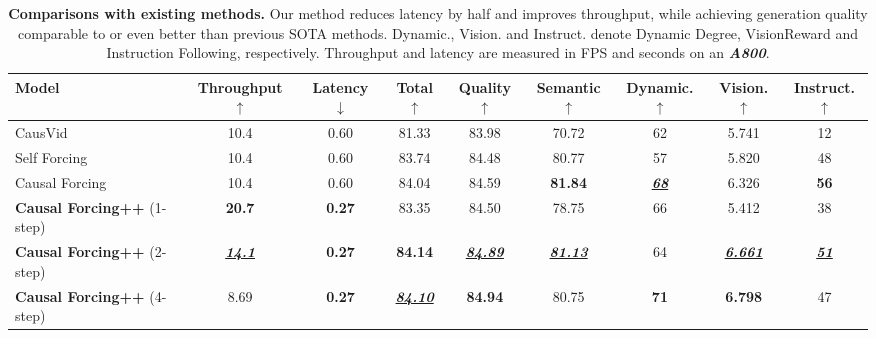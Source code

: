 \begin{table}[h]
\small\setlength{\tabcolsep}{1pt} %
\caption{\textbf{Comparisons with existing methods.} Our method reduces latency by half and improves throughput, while achieving generation quality comparable to or even better than previous SOTA methods. Dynamic., Vision. and Instruct. denote Dynamic Degree, VisionReward and Instruction Following, respectively. Throughput and latency are measured in FPS and seconds on an \textbf{\textit{A800}}.\protect\footnotemark}
  \label{tab:performance-comparison}
  \centering
  \begin{tabular}{lcccccccc}
      \toprule
      Model & Throughput $\uparrow$& Latency $\downarrow$&Total$\uparrow$ & Quality$\uparrow$ & Semantic$\uparrow$ 
      & Dynamic.$\uparrow$
      & Vision.$\uparrow$
      & Instruct.$\uparrow$
       \\
    \midrule
    CausVid~\cite{yin2025slow}& 10.4 & 0.60 & 81.33 & 83.98 & 70.72 &  62  & 5.741 & 12 \\
    Self Forcing~\cite{huang2025self} & 10.4 & 0.60 & 83.74 & 84.48 & 80.77 & 57 & 5.820 & 48 \\
   Causal Forcing~\cite{zhu2026causal}  & 10.4 & 0.60 & 84.04 & 84.59& \textbf{81.84} & \underline{\textbf{\textit{68}}} & 6.326 & \textbf{56} \\
      \textbf{Causal Forcing++} (1-step)  & \textbf{20.7} & \textbf{0.27} &83.35 & 84.50  &   78.75 & 66 & 5.412 & 38\\
      \textbf{Causal Forcing++} (2-step)  & \underline{\textit{\textbf{14.1}}} & \textbf{0.27} & \textbf{84.14} & \underline{\textbf{\textit{84.89}}}  &   \underline{\textbf{\textit{81.13}}} & 64 &\underline{\textbf{\textit{6.661}}} & \underline{\textbf{\textit{51}}} \\
     \textbf{Causal Forcing++} (4-step)  & 8.69 & \textbf{0.27} & \underline{\textbf{\textit{84.10}}} & \textbf{84.94}  &   80.75 & \textbf{71} &\textbf{6.798} &  47\\
    \bottomrule
  \end{tabular}\\
\end{table}
